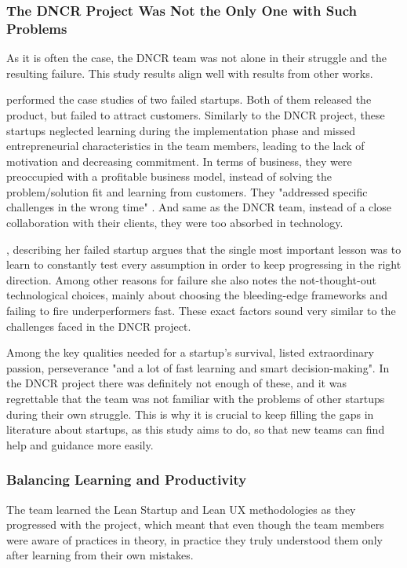 \documentclass{article}
\begin{document}
\subsubsection{The DNCR Project Was Not the Only One with Such Problems}
As it is often the case, the DNCR team was not alone in their struggle and the resulting failure. This study results align well with results from other works.

\cite{giardino2014early} performed the case studies of two failed startups. Both of them released the product, but failed to attract customers. Similarly to the DNCR project, these startups neglected learning during the implementation phase and missed entrepreneurial characteristics in the team members, leading to the lack of motivation and decreasing commitment. In terms of business, they were preoccupied with a profitable business model, instead of solving the problem/solution fit and learning from customers. They "addressed specific challenges in the wrong time" \citep[37]{giardino2014early}. And same as the DNCR team, instead of a close collaboration with their clients, they were too absorbed in technology.

\cite{may2012applying}, describing her failed startup argues that the single most important lesson was to learn to constantly test every assumption in order to keep progressing in the right direction. Among other reasons for failure she also notes the not-thought-out technological choices, mainly about choosing the bleeding-edge frameworks and failing to fire underperformers fast. These exact factors sound very similar to the challenges faced in the DNCR project.


Among the key qualities needed for a startup's survival, \citet[146]{may2012applying} listed extraordinary passion, perseverance "and a lot of fast learning and smart decision-making". In the DNCR project there was definitely not enough of these, and it was regrettable that the team was not familiar with the problems of other startups during their own struggle. This is why it is crucial to keep filling the gaps in literature about startups, as this study aims to do, so that new teams can find help and guidance more easily.
\subsubsection{Balancing Learning and Productivity}
The team learned the Lean Startup and Lean UX methodologies as they progressed with the project, which meant that even though the team members were aware of practices in theory, in practice they truly understood them only after learning from their own mistakes.
\end{document}
